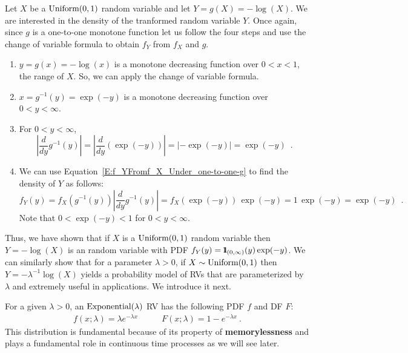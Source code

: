 \begin{example}
Let $X$ be a $\mbox{{\rm Uniform}}(0,1)$ random variable and let $Y=g(X)=-\log(X)$.  
We are interested in the density of the tranformed random variable $Y$.  
Once again, since $g$ is a one-to-one monotone function let us follow the four steps and use the change of variable formula to obtain $f_Y$ from $f_X$ and $g$.
\begin{enumerate}
\item $y=g(x)=-\log(x)$ is a monotone decreasing function over $0 < x < 1$, the range of $X$.  
So, we can apply the change of variable formula. 
\item $x=g^{-1}(y)=\exp(-y)$ is a monotone decreasing function over %
$0 < y < \infty$.  
\item For $0 < y < \infty$,
\[
 \left\vert \frac{d}{dy} g^{-1}(y) \right\vert 
= \left\vert \frac{d}{dy} \left( \exp(-y) \right) \right\vert 
= \left\vert -\exp(-y) \right\vert = \exp(-y) \enspace .
\]
\item We can use Equation~\eqref{E:f_YFromf_X_Under_one-to-one-g} to find the density of $Y$ as follows:
\[
f_Y(y) = f_X \left( g^{-1}(y) \right) \left\vert \frac{d}{dy} g^{-1}(y) \right\vert 
= f_X \left( \exp(-y) \right)  \, \exp(-y)
= 1 \, \exp(-y) = \exp(-y) \enspace .
\]
Note that $0 < \exp(-y) < 1$ for $0 < y < \infty$.
\end{enumerate}
Thus, we have shown that if $X$ is a $\mbox{{\rm Uniform}}(0,1)$ random variable then $Y=-\log(X)$ is an random variable with PDF $f_Y(y)={1}\mspace{-11 mu}{1}_{(0,\infty)}(y)\exp(-y)$. 
We can similarly show that for a parameter $\lambda>0$, if $X \sim \mbox{{\rm Uniform}}(0,1)$ then $Y=-\lambda^{-1} \log(X)$ yields a probability model of RVs that are parameterized by $\lambda$ and extremely useful in applications. We introduce it next.
\end{example}

\begin{model}[$\exponential(\lambda)$]\label{M:exponential}
For a given $\lambda > 0$, an $\exponential(\lambda)$ RV has the following PDF $f$ and DF $F$:
\begin{eqnarray}\label{E:Exponentialpdfcdf}
f(x; \lambda) = \lambda e^{-\lambda x} \qquad &
F(x; \lambda)= 1-e^{-\lambda x}  \ .
\end{eqnarray}
This distribution is fundamental because of its property of {\bf memorylessness} and plays a fundamental role in continuous time
processes as we will see later.
\end{model}

